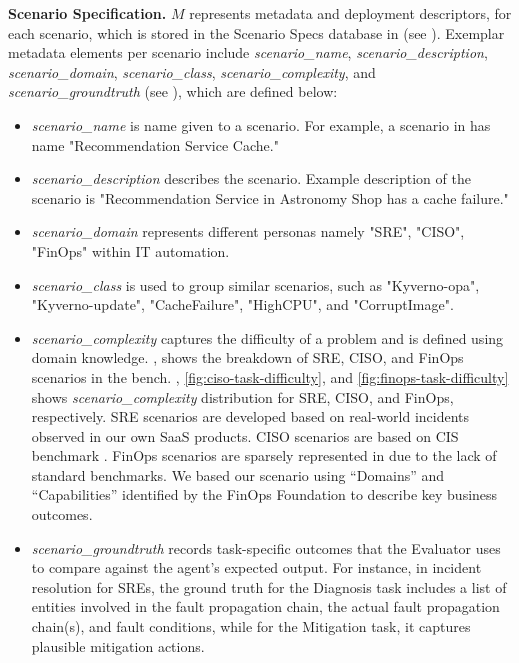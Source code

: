 \textbf{Scenario Specification.} $M$ represents metadata and deployment descriptors, for each scenario, which is stored in the Scenario Specs database in \bench (see ). Exemplar metadata elements per scenario include \textit{scenario\_name}, \textit{scenario\_description}, \textit{scenario\_domain}, \textit{scenario\_class}, \textit{scenario\_complexity}, and \textit{scenario\_groundtruth} (see ), which are defined below:
\begin{itemize}[left=0pt, topsep=0pt, partopsep=0pt, itemsep=0pt, parsep=0pt]
    \item \textit{scenario\_name} is name given to a scenario. For example, a scenario in \bench has name "Recommendation Service Cache."
    \item \textit{scenario\_description} describes the scenario. Example description of the scenario is "Recommendation Service in Astronomy Shop has a cache failure."
    \item \textit{scenario\_domain} represents different personas namely "SRE", "CISO", "FinOps" within IT automation. 
    \item \textit{scenario\_class} is used to group similar scenarios, such as "Kyverno-opa", "Kyverno-update", "CacheFailure", "HighCPU", and "CorruptImage".
    \item \textit{scenario\_complexity} captures the difficulty of a problem and is defined using domain knowledge. , shows the breakdown of SRE, CISO, and FinOps scenarios in the bench. , \ref{fig:ciso-task-difficulty}, and \ref{fig:finops-task-difficulty} shows \textit{scenario\_complexity} distribution for SRE, CISO, and FinOps, respectively. SRE scenarios are developed based on real-world incidents observed in our own SaaS products. CISO scenarios are based on CIS benchmark \cite{CISBenchmarks}. FinOps scenarios are sparsely represented in \bench due to the lack of standard benchmarks. We based our scenario using ``Domains'' and ``Capabilities'' identified by the FinOps Foundation \cite{finopsbench} to describe key business outcomes. 
    \item \textit{scenario\_groundtruth} records task-specific outcomes that the Evaluator uses to compare against the agent's expected output. For instance, in incident resolution for SREs, the ground truth for the Diagnosis task includes a list of entities involved in the fault propagation chain, the actual fault propagation chain(s), and fault conditions, while for the Mitigation task, it captures plausible mitigation actions.
\end{itemize}


